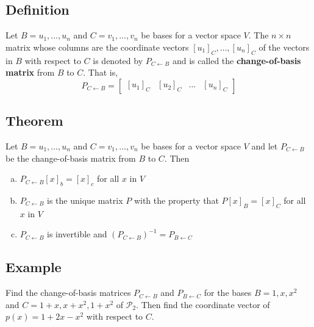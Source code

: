 \subsection*{Definition}
Let $B={u_1,\dots,u_n}$ and $C={v_1,\dots,v_n}$ be bases for a vector space $V$.
The $n\times n$ matrix whose columns are the coordinate vectors $[u_1]_C,\dots,[u_n]_C$
of the vectors in $B$ with respect to $C$ is denoted by $P_{C\leftarrow B}$ and is
called the \textbf{change-of-basis matrix} from $B$ to $C$. That is,
\[P_{C\leftarrow B}=\begin{bmatrix}
        [u_1]_C & [u_2]_C & \dots & [u_n]_C
    \end{bmatrix}\]

\subsection*{Theorem}
Let $B={u_1,\dots,u_n}$ and $C={v_1,\dots,v_n}$ be bases for a vector space $V$
and let $P_{C\leftarrow B}$ be the change-of-basis matrix from $B$ to $C$. Then
\begin{enumerate}[(a)]
    \item $P_{C\leftarrow B}[x]_b=[x]_c$ for all $x$ in $V$
    \item $P_{C\leftarrow B}$ is the unique matrix $P$ with the property
          that $P[x]_B = [x]_C$ for all $x$ in $V$
    \item $P_{C\leftarrow B}$ is invertible and $(P_{C\leftarrow B})^{-1}=P_{B\leftarrow C}$
\end{enumerate}

\subsection*{Example}
Find the change-of-basis matrices $P_{C\leftarrow B}$ and $P_{B\leftarrow C}$
for the bases $B={1,x,x^2}$ and $C={1+x,x+x^2,1+x^2}$ of $\mathscr{P}_2$.
Then find the coordinate vector of $p(x)=1+2x-x^2$ with respect to $C$.

